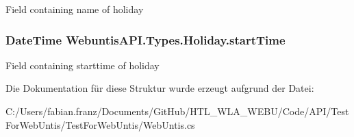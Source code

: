 Field containing name of holiday \hypertarget{struct_webuntis_a_p_i_1_1_types_1_1_holiday_a489a91e746530bfed3300c39533297f1}{
\subsubsection[{start\-Time}]{\setlength{\rightskip}{0pt plus 5cm}Date\-Time Webuntis\-A\-P\-I.\-Types.\-Holiday.\-start\-Time}}\label{struct_webuntis_a_p_i_1_1_types_1_1_holiday_a489a91e746530bfed3300c39533297f1}
Field containing starttime of holiday 

Die Dokumentation für diese Struktur wurde erzeugt aufgrund der Datei\-:\begin{DoxyCompactItemize}
\item 
C\-:/\-Users/fabian.\-franz/\-Documents/\-Git\-Hub/\-H\-T\-L\-\_\-\-W\-L\-A\-\_\-\-W\-E\-B\-U/\-Code/\-A\-P\-I/\-Test\-For\-Web\-Untis/\-Test\-For\-Web\-Untis/Web\-Untis.\-cs\end{DoxyCompactItemize}
